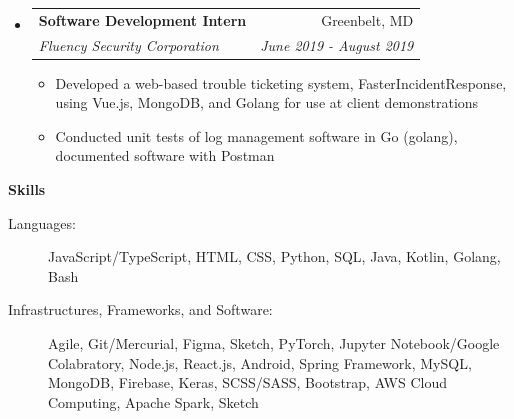 \documentclass[letterpaper,10pt]{article}
\makeatletter
\newcommand{\resitem}[1]{\item #1 \vspace{-3.5pt}}  %
\newcommand{\resheading}[1]{{\large \colorbox{mygrey}{\begin{minipage}{0.989\textwidth}{\textbf{#1 \vphantom{p\^{E}}}}\end{minipage}}}}
\newcommand{\ressubheading}[4]{
\begin{tabular*}{7.0in}{l@{\extracolsep{\fill}}r}  
		\textbf{#1} & #2 \\
		\textit{#3} & \textit{#4} \\
\end{tabular*}\vspace{-6pt}}  %
\makeatother
\begin{document}
\begin{itemize}
    \begin{itemize}
        \resitem{Created an item tracking app, "TAG", that has specific detection range close to most commercially available tracking tags by examining Global Positioning System (GPS)/Bluetooth/Wifi signal strength with Android SDK}
        \resitem{Detected near-proximity items with RSSI strength of various close-range signals and GPS for faraway items}
    \end{itemize}
\item
    \ressubheading{Software Development Intern}{Greenbelt, MD}{Fluency Security Corporation}{June 2019 - August 2019}
    \begin{itemize}
        \resitem{Developed a web-based trouble ticketing system, FasterIncidentResponse, using Vue.js, MongoDB, and Golang for use at client demonstrations}
        \resitem{Conducted unit tests of log management software in Go (golang), documented software with Postman}
    \end{itemize}
\end{itemize}



\resheading{Skills}

\begin{description}
\item[Languages:] JavaScript/TypeScript, HTML, CSS, Python, SQL, Java, Kotlin, Golang, Bash
\item[Infrastructures, Frameworks, and Software:] Agile, Git/Mercurial, Figma, Sketch, PyTorch, Jupyter Notebook/Google Colabratory, Node.js, React.js, Android, Spring Framework, MySQL, MongoDB, Firebase, Keras, SCSS/SASS, Bootstrap, AWS Cloud Computing, Apache Spark, Sketch
\end{description}
\end{document}

